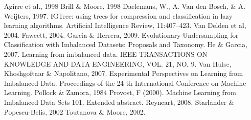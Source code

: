 \documentclass[12pt]{article}
\begin{document}
\begin{thebibliography}{99}

Agirre et al., 1998
Brill \& Moore, 1998
Daelemans, W., A. Van den Bosch, \& A. Weijters, 1997. IGTree: using trees for compression and classification in lazy learning algorithms. Artificial Intelligence Review, 11:407–423.
Van Delden et al, 2004.
Fawcett, 2004.
Garcia \& Herrera, 2009. Evolutionary Undersampling for Classification with Imbalanced Datasets: Proposals and Taxonomy.
He \& Garcia, 2007. Learning from imbalanced data. IEEE TRANSACTIONS ON KNOWLEDGE AND DATA ENGINEERING, VOL. 21, NO. 9.
Van Hulse, Khoshgoftaar \& Napolitano, 2007. Experimental Perspectives on Learning from Imbalanced Data. Proceedings of the 24 th International Conference on Machine Learning.
Pollock \& Zamora, 1984
Provost, F (2000). Machine Learning from Imbalanced Data Sets 101. Extended abstract. 
Reyneart, 2008.
Starlander \& Popescu-Belis, 2002
Toutanova \& Moore, 2002.

\end{thebibliography}

\end{document}
